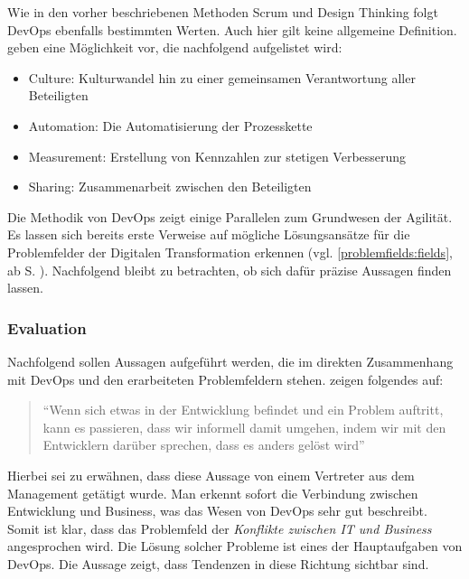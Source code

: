 Wie in den vorher beschriebenen Methoden Scrum und Design Thinking folgt DevOps ebenfalls bestimmten Werten. Auch hier gilt keine allgemeine Definition.  geben eine Möglichkeit vor, die nachfolgend aufgelistet wird:

\begin{itemize}[noitemsep, topsep=0pt]
	\item Culture: Kulturwandel hin zu einer gemeinsamen Verantwortung aller Beteiligten
	\item Automation: Die Automatisierung der Prozesskette
	\item Measurement: Erstellung von Kennzahlen zur stetigen Verbesserung
	\item Sharing: Zusammenarbeit zwischen den Beteiligten
\end{itemize}

Die Methodik von DevOps zeigt einige Parallelen zum Grundwesen der Agilität. Es lassen sich bereits erste Verweise auf mögliche Lösungsansätze für die Problemfelder der Digitalen Transformation erkennen (vgl. \ref{problemfields:fields}, ab S. \pageref{problemfields:fields}). Nachfolgend bleibt zu betrachten, ob sich dafür präzise Aussagen finden lassen. 

\subsubsection{Evaluation}

Nachfolgend sollen Aussagen aufgeführt werden, die  im direkten Zusammenhang mit DevOps und den erarbeiteten Problemfeldern stehen.  zeigen folgendes auf:

\begin{quote}
	``Wenn sich etwas in der Entwicklung befindet und ein Problem auftritt, kann es passieren, dass wir informell damit umgehen, indem wir mit den Entwicklern darüber sprechen, dass es anders gelöst wird'' \cite[S. 6]{mikalsen_agile_2018}
\end{quote}

Hierbei sei zu erwähnen, dass diese Aussage von einem Vertreter aus dem Management getätigt wurde. Man erkennt sofort die Verbindung zwischen Entwicklung und Business, was das Wesen von DevOps sehr gut beschreibt. Somit ist klar, dass das Problemfeld der \textit{Konflikte zwischen IT und Business} angesprochen wird. Die Lösung solcher Probleme ist eines der Hauptaufgaben von DevOps. Die Aussage zeigt, dass Tendenzen in diese Richtung sichtbar sind.

